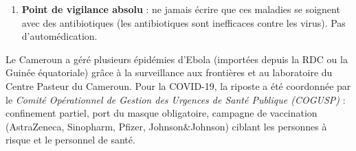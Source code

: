 \documentclass[11pt]{article}
\begin{document}
\begin{methode}
\begin{enumerate}
\begin{itemize}
\item COVID-19 : \textbf{gestes barrières} (lavage mains fréquent, port du masque chirurgical/FFP2 en espace clos/affluence, distanciation physique $\ge 1$ m, étiquette respiratoire), \textbf{aération} des lieux clos (10 min / heure), \textbf{dépistage} (tests antigéniques/PCR) et isolement des cas positifs, \textbf{vaccination} (vaccins à ARNm, vecteur viral, protéine recombinante) pour prévenir les formes graves.
\end{itemize}
\item \textbf{Point de vigilance absolu} : ne jamais écrire que ces maladies se soignent avec des antibiotiques (les antibiotiques sont inefficaces contre les virus). Pas d'automédication.
\end{enumerate}
\end{methode}

\begin{savaistu}
Le Cameroun a géré plusieurs épidémies d'Ebola (importées depuis la RDC ou la Guinée équatoriale) grâce à la surveillance aux frontières et au laboratoire du Centre Pasteur du Cameroun. Pour la COVID-19, la riposte a été coordonnée par le \emph{Comité Opérationnel de Gestion des Urgences de Santé Publique (COGUSP)} : confinement partiel, port du masque obligatoire, campagne de vaccination (AstraZeneca, Sinopharm, Pfizer, Johnson\&Johnson) ciblant les personnes à risque et le personnel de santé.
\end{savaistu}
\end{document}
